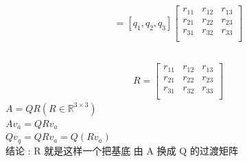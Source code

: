 \documentclass[12pt]{article}
\begin{document}
\begin{flushleft}
\begin{align}
        = [q_{1},q_{2},q_{3}] \begin{bmatrix}
                                  r_{11} & r_{12} & r_{13} \\
                                  r_{21} & r_{22} & r_{23} \\
                                  r_{31} & r_{32} & r_{33} \\
                              \end{bmatrix}                                                                                   \\
    \end{align} \\
    \begin{align}
        R = \begin{bmatrix}
                r_{11} & r_{12} & r_{13} \\
                r_{21} & r_{22} & r_{23} \\
                r_{31} & r_{32} & r_{33} \\
            \end{bmatrix}
    \end{align}
    $A = QR (R \in \mathbb{R}^{3 \times 3})$ \\
    $Av_{a} = QRv_{a}$ \\
    $Qv_{q} = QRv_{a} = Q(Rv_{a})$ \\
    结论 : R 就是这样一个把基底 由 A 换成 Q 的过渡矩阵


\end{flushleft}
\end{document}
